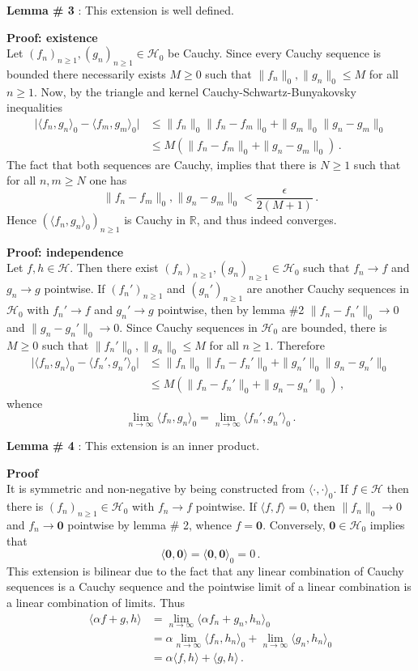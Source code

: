 \documentclass[a4paper]{article}
\newcommand{\Real}{\mathbb{R}}
\newcommand{\nil}{\mathbf{0}}
\newcommand{\Hcal}{\mathcal{H}}
\begin{document}
\noindent\textbf{Lemma \# 3} : This extension is well defined.

\noindent\textbf{Proof: existence} \hfill\\
Let $(f_n)_{n\geq1},(g_n)_{n\geq1}\in \Hcal_0$ be Cauchy. Since every Cauchy sequence
is bounded there necessarily exists $M\geq 0$ such that $\|f_n\|_0,\|g_n\|_0 \leq M$
for all $n\geq1$. Now, by the triangle and kernel Cauchy-Schwartz-Bunyakovsky inequalities
\begin{align*}
\bigl| \langle f_n, g_n\rangle_0 - \langle f_m, g_m\rangle_0 \bigr|
&\leq \|f_n\|_0\|f_n-f_m\|_0+\|g_m\|_0\|g_n-g_m\|_0\\
&\leq M ( \|f_n-f_m\|_0+\|g_n-g_m\|_0)\,.
\end{align*}
The fact that both sequences are Cauchy, implies that there is $N\geq1$ such that
for all $n, m\geq N$ one has
\[ \|f_n-f_m\|_0,\|g_n-g_m\|_0 < \frac{\epsilon}{2(M+1)}\,. \]
Hence $(\langle f_n, g_n\rangle_0)_{n\geq1}$ is Cauchy in $\Real$, and thus indeed
converges.

\noindent\textbf{Proof: independence} \hfill \\
Let $f,h\in \Hcal$. Then there exist $(f_n)_{n\geq1},(g_n)_{n\geq1}\in \Hcal_0$
such that $f_n\to f$ and $g_n \to g$ pointwise. If $(f_n')_{n\geq1}$ and $(g_n')_{n\geq1}$
are another Cauchy sequences in $\Hcal_0$ with $f_n' \to f$ and $g_n' \to g$ pointwise,
then by lemma \#2 $\|f_n-f_n'\|_0\to 0$ and $\|g_n-g_n'\|_0\to 0$. Since Cauchy sequences
in $\Hcal_0$ are bounded, there is $M\geq0$ such that $\|f_n'\|_0,\|g_n\|_0\leq M$
for all $n\geq1$. Therefore
\begin{align*}
\bigl| \langle f_n, g_n\rangle_0 - \langle f_n', g_n'\rangle_0 \bigr|
&\leq \|f_n\|_0\|f_n-f_n'\|_0+\|g_n'\|_0\|g_n-g_n'\|_0\\
&\leq M ( \|f_n-f_n'\|_0+\|g_n-g_n'\|_0)\,,
\end{align*}
whence
\[
\lim_{n\to \infty} \langle f_n, g_n \rangle_0
= \lim_{n\to \infty} \langle f_n', g_n' \rangle_0\,.
\]

\noindent\textbf{Lemma \# 4} : This extension is an inner product.

\noindent\textbf{Proof} \hfill \\
It is symmetric and non-negative by being constructed from $\langle\cdot,\cdot\rangle_0$.
If $f\in\Hcal$ then there is $(f_n)_{n\geq1}\in \Hcal_0$ with $f_n\to f$ pointwise.
If $\langle f,f\rangle = 0$, then $\|f_n\|_0\to 0$ and $f_n \to \nil$ pointwise by lemma \# 2,
whence $f = \nil$. Conversely, $\nil\in\Hcal_0$ implies that
\[ \langle \nil,\nil \rangle = \langle \nil,\nil \rangle_0 = 0 \,. \]
This extension is bilinear due to the fact that any linear combination of Cauchy sequences is
a Cauchy sequence and the pointwise limit of a linear combination is a linear
combination of limits. Thus
\begin{align*}
	\langle \alpha f + g, h \rangle
	&= \lim_{n\to\infty}\langle \alpha f_n + g_n, h_n \rangle_0\\
	&= \alpha \lim_{n\to\infty}\langle f_n, h_n \rangle_0
		+ \lim_{n\to\infty}\langle g_n, h_n \rangle_0\\
	&= \alpha \langle f, h \rangle + \langle g, h \rangle\,.
\end{align*}
\end{document}
